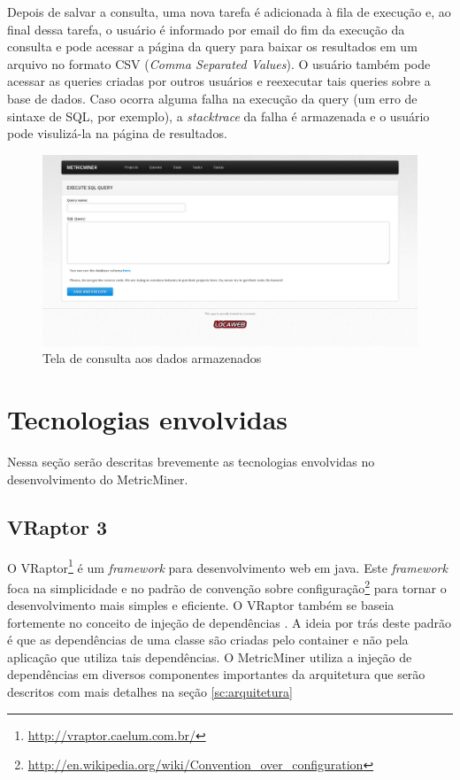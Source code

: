 \documentclass[a4paper, 12pt, twoside]{book}
\begin{document}
        Depois de salvar a consulta, uma nova tarefa é adicionada à fila de execução e, ao final dessa tarefa, o usuário é informado por email do fim da execução da consulta e pode acessar a página da query para baixar os resultados em um arquivo no formato CSV (\textit{Comma Separated Values}). O usuário também pode acessar as queries criadas por outros usuários e reexecutar tais queries sobre a base de dados. Caso ocorra alguma falha na execução da query (um erro de sintaxe de SQL, por exemplo), a \textit{stacktrace} da falha é armazenada e o usuário pode visulizá-la na página de resultados.

        \begin{figure}[ht]
            \centering
            \includegraphics[width=1.00\textwidth]{img/query.png}
            \caption{Tela de consulta aos dados armazenados}
            \label{fig:screen_query}
        \end{figure}
        \clearpage

    \section{Tecnologias envolvidas} \label{sc:tecnologias}

        Nessa seção serão descritas brevemente as tecnologias envolvidas no desenvolvimento do MetricMiner.

        \subsection*{VRaptor 3}
            O VRaptor\footnote{\url{http://vraptor.caelum.com.br/}} é um \textit{framework} para desenvolvimento 
            web em java. Este \textit{framework} foca na simplicidade e no padrão de convenção sobre 
            configuração\footnote{\url{http://en.wikipedia.org/wiki/Convention_over_configuration}} para tornar o 
            desenvolvimento mais simples e eficiente. O VRaptor também se baseia fortemente no conceito de injeção 
            de dependências \cite{fowlerdi}. A ideia por trás deste padrão é que as dependências de uma classe 
            são criadas pelo container e não pela aplicação que utiliza tais dependências. O MetricMiner utiliza a 
            injeção de dependências em diversos componentes importantes da arquitetura que serão descritos com 
            mais detalhes na seção \ref{sc:arquitetura}
\end{document}
